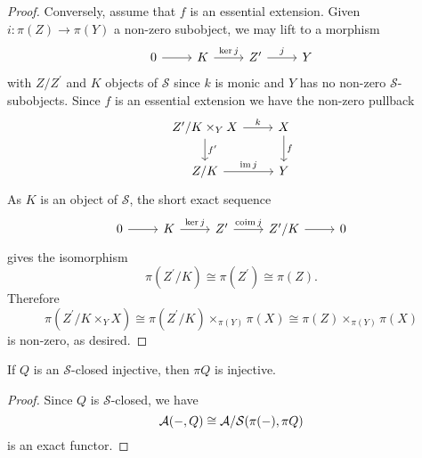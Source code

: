 \documentclass[dissertation.tex]{subfiles}
\begin{document}
\begin{lem}
\begin{proof}
    Conversely, assume that $f$ is an essential extension.
    Given $i : \pi(Z) \rightarrow \pi(Y)$ a non-zero subobject, we may lift to a morphism 
    $$\begin{tikzcd}
      0 \arrow{r} & K \arrow{r}{\ker{j}} & Z^\prime \arrow{r}{j} & Y
    \end{tikzcd}$$
    with $Z/Z^\prime$ and $K$ objects of $\mathcal{S}$ since $k$ is monic and $Y$ has no non-zero $\mathcal{S}$-subobjects.
    Since $f$ is an essential extension we have the non-zero pullback
    $$\begin{tikzcd}
      Z^\prime / K \times_Y X \arrow{r}{k}\arrow{d}{f^\prime} & X\arrow{d}{f} \\
      Z/K \arrow{r}{\im{j}}& Y
    \end{tikzcd}$$
    As $K$ is an object of $\mathcal{S}$, the short exact sequence
    $$\begin{tikzcd}
      0 \arrow{r} & K \arrow{r}{\ker{j}} & Z^\prime \arrow{r}{\coim{j}} & Z^\prime/K \arrow{r} & 0
    \end{tikzcd}$$
    gives the isomorphism
    $$\pi(Z^\prime/K) \cong \pi(Z^\prime) \cong \pi(Z).$$
    Therefore
    $$\pi(Z^\prime/K \times_Y X) \cong \pi(Z^\prime/K) \times_{\pi(Y)} \pi(X) \cong \pi(Z) \times_{\pi(Y)} \pi(X)$$
    is non-zero, as desired.
  \end{proof}
\end{lem}

\begin{lem}\label{lem6}
  If $Q$ is an $\mathcal{S}$-closed injective, then $\pi{Q}$ is injective.

  \begin{proof}
    Since $Q$ is $\mathcal{S}$-closed, we have
    $$\mathcal{A}(-, Q) \cong \mathcal{A}/\mathcal{S}(\pi(-), \pi{Q})$$
    is an exact functor.
  \end{proof}
\end{lem}
\end{document}
